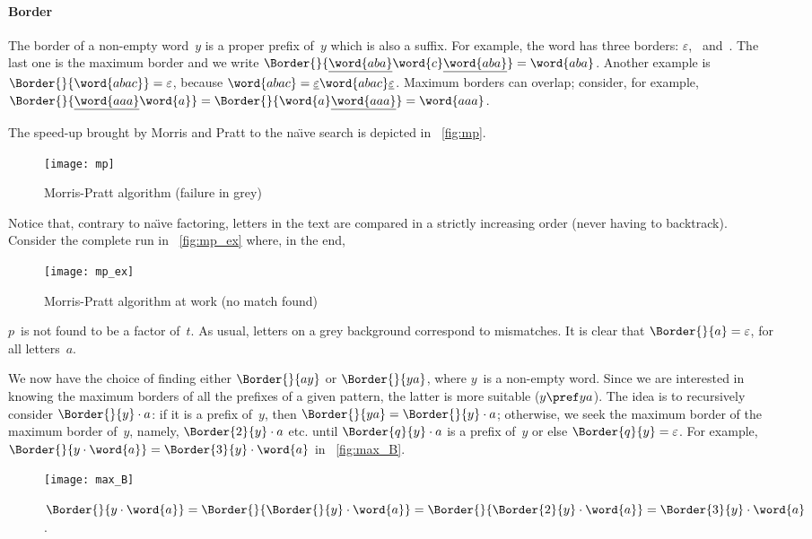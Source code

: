 \paragraph{Border}

The border of a non\hyp{}empty word~\(y\) is a proper prefix of~\(y\)
which is also a suffix. For example, the word  has three
borders: \(\varepsilon\), ~and~. The last one is the
maximum border and we write
\(\Border{}{\underline{\word{aba}}\word{c}\underline{\word{aba}}} =
\word{aba}\). Another example is \(\Border{}{\word{abac}} =
\varepsilon\), because \(\word{abac} =
\underline{\varepsilon}\word{abac}\underline{\varepsilon}\). Maximum
borders can overlap; consider, for example,
\(\Border{}{\underline{\word{aaa}}\word{a}} =
\Border{}{\word{a}\underline{\word{aaa}}} = \word{aaa}\).

The speed\hyp{}up brought by Morris and Pratt to the na\"{\i}ve search
is depicted in \fig~\vref{fig:mp}.
\begin{figure}[b]
\centering
\texttt{[image: mp]}
\caption{Morris-Pratt algorithm (failure in grey)}
\label{fig:mp}
\end{figure}
Notice that, contrary to na\"{\i}ve factoring, letters in the text are
compared in a strictly increasing order (never having to
backtrack). Consider the complete run in \fig~\vref{fig:mp_ex} where,
in the end,
\begin{figure}[t]
\centering
\texttt{[image: mp\_ex]}
\caption{Morris\hyp{}Pratt algorithm at work (no match found)}
\label{fig:mp_ex}
\end{figure}
\(p\)~is not found to be a factor of~\(t\). As usual, letters on a
grey background correspond to mismatches. It is clear that
\(\Border{}{a} = \varepsilon\), for all letters~\(a\).

We now have the choice of finding either \(\Border{}{ay}\) or
\(\Border{}{ya}\), where \(y\)~is a non\hyp{}empty word. Since we are
interested in knowing the maximum borders of all the prefixes of a
given pattern, the latter is more suitable (\(y \pref ya\)). The idea
is to recursively consider \(\Border{}{y} \cdot a\): if it is a prefix
of~\(y\), then \(\Border{}{ya} = \Border{}{y} \cdot a\); otherwise, we
seek the maximum border of the maximum border of~\(y\), namely,
\(\Border{2}{y} \cdot a\) etc. until \(\Border{q}{y} \cdot a\) is a
prefix of~\(y\) or else \(\Border{q}{y} = \varepsilon\). For example,
\(\Border{}{y \cdot \word{a}} = \Border{3}{y} \cdot \word{a}\) in
\fig~\vref{fig:max_B}.
\begin{figure}[b]
\centering
\texttt{[image: max\_B]}
\caption{\(\Border{}{y \cdot \word{a}}
   = \Border{}{\Border{}{y} \cdot \word{a}}
   = \Border{}{\Border{2}{y} \cdot \word{a}}
   = \Border{3}{y} \cdot \word{a}\).}
\label{fig:max_B}
\end{figure}

